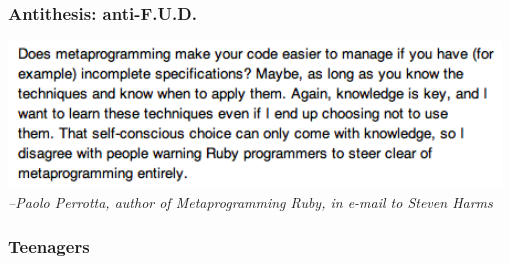 \documentclass[slidestop,compress,mathserif]{beamer}
\begin{document}
\begin{frame}
	\frametitle{Antithesis:  anti-F.U.D.}
	\includegraphics[width=0.98\textwidth, height=0.45\textheight]{img/paolo_anti_fud.png}
	\vskip 0.5cm
	\emph{--Paolo Perrotta, author of Metaprogramming Ruby, in e-mail to Steven Harms}
\end{frame}

\subsubsection{Teenagers} %
\label{ssub:teenagers}
\end{document}
